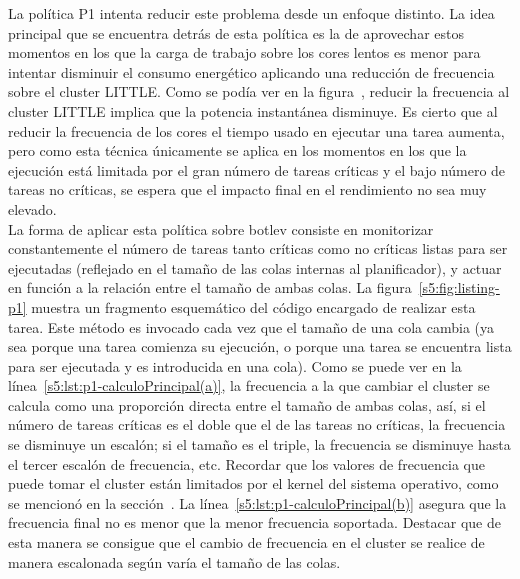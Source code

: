La política P1 intenta reducir este problema desde un enfoque distinto. La
idea principal que se encuentra detrás de esta política es la de aprovechar
estos momentos en los que la carga de trabajo sobre los cores lentos es
menor para intentar disminuir el consumo energético aplicando una reducción
de frecuencia sobre el cluster LITTLE. Como se podía ver en la
figura~, reducir la frecuencia al cluster LITTLE implica que la
potencia instantánea disminuye. Es cierto que al reducir la frecuencia de
los cores el tiempo usado en ejecutar una tarea aumenta, pero como esta
técnica únicamente se aplica en los momentos en los que la ejecución está
limitada por el gran número de tareas críticas y el bajo número de tareas
no críticas, se espera que el impacto final en el rendimiento no sea muy
elevado.\\
La forma de aplicar esta política sobre botlev consiste en monitorizar
constantemente el número de tareas tanto críticas como no críticas listas
para ser ejecutadas (reflejado en el tamaño de las colas internas al
planificador), y actuar en función a la relación entre el tamaño de ambas
colas. La figura~\ref{s5:fig:listing-p1} muestra un fragmento esquemático
del código encargado de realizar esta tarea. Este método es invocado cada
vez que el tamaño de una cola cambia (ya sea porque una tarea comienza su
ejecución, o porque una tarea se encuentra lista para ser ejecutada y es
introducida en una cola). Como se puede ver en la
línea~\ref{s5:lst:p1-calculoPrincipal(a)}, la frecuencia a la que cambiar
el cluster se calcula como una proporción directa entre el tamaño de ambas
colas, así, si el número de tareas críticas es el doble que el de las
tareas no críticas, la frecuencia se disminuye un escalón; si el tamaño es
el triple, la frecuencia se disminuye hasta el tercer escalón de
frecuencia, etc. Recordar que los valores de frecuencia que puede tomar el
cluster están limitados por el kernel del sistema operativo, como se
mencionó en la sección~. La
línea~\ref{s5:lst:p1-calculoPrincipal(b)} asegura que la frecuencia final
no es menor que la menor frecuencia soportada. Destacar que de esta manera
se consigue que el cambio de frecuencia en el cluster se realice de manera
escalonada según varía el tamaño de las colas.\\
